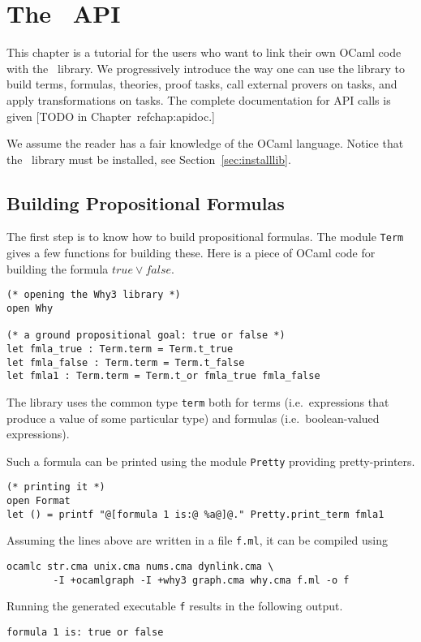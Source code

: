 \chapter{The \why\ API}
\label{chap:api}

This chapter is a tutorial for the users who want to link their own
OCaml code with the \why\ library. We progressively introduce the way
one can use the library to build terms, formulas, theories, proof
tasks, call external provers on tasks, and apply transformations on
tasks. The complete documentation for API calls is given
[TODO in Chapter~ref{chap:apidoc}.]

We assume the reader has a fair knowledge of the OCaml
language. Notice that the \why\ library must be installed,
see Section~\ref{sec:installlib}.


\section{Building Propositional Formulas}

The first step is to know how to build propositional formulas. The
module \texttt{Term} gives a few functions for building these. Here is
a piece of OCaml code for building the formula $true \lor false$.
\begin{verbatim}
(* opening the Why3 library *)
open Why

(* a ground propositional goal: true or false *)
let fmla_true : Term.term = Term.t_true
let fmla_false : Term.term = Term.t_false
let fmla1 : Term.term = Term.t_or fmla_true fmla_false
\end{verbatim}
The library uses the common type \texttt{term} both for terms
(i.e.~expressions that produce a value of some particular type)
and formulas (i.e.~boolean-valued expressions).

Such a formula can be printed using the module \texttt{Pretty}
providing pretty-printers.
\begin{verbatim}
(* printing it *)
open Format
let () = printf "@[formula 1 is:@ %a@]@." Pretty.print_term fmla1
\end{verbatim}

Assuming the lines above are written in a file \texttt{f.ml}, it can
be compiled using
\begin{verbatim}
ocamlc str.cma unix.cma nums.cma dynlink.cma \
        -I +ocamlgraph -I +why3 graph.cma why.cma f.ml -o f
\end{verbatim}
Running the generated executable \texttt{f} results in the following output.
\begin{verbatim}
formula 1 is: true or false
\end{verbatim}

